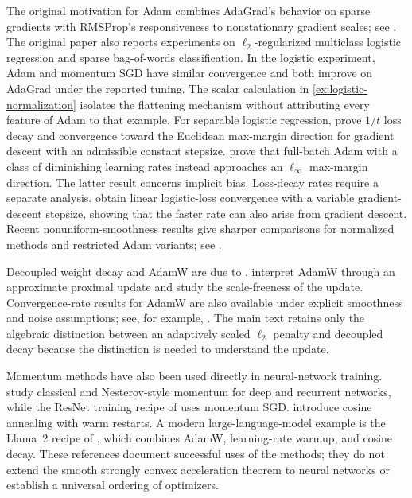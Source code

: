 \documentclass[11pt,twoside]{article}
\theoremstyle{definition}
\theoremstyle{remark}
\begin{document}
The original motivation for Adam combines AdaGrad's behavior on sparse
gradients with RMSProp's responsiveness to nonstationary gradient scales; see
\citet{kingma2015}. The original paper also reports experiments on
$\ell_2$-regularized multiclass logistic regression and sparse bag-of-words
classification. In the logistic experiment, Adam and momentum SGD have
similar convergence and both improve on AdaGrad under the reported tuning.
The scalar calculation in
\cref{ex:logistic-normalization} isolates the flattening mechanism without
attributing every feature of Adam to that example. For separable logistic
regression, \citet{soudry2018} prove $1/t$ loss decay and convergence toward
the Euclidean max-margin direction for gradient descent with an admissible
constant stepsize.
\citet{zhang2024adambias} prove that full-batch Adam with a class of
diminishing learning rates instead approaches an $\ell_\infty$ max-margin
direction. The latter result concerns implicit bias. Loss-decay rates require
a separate analysis. \citet{axiotis2023} obtain linear logistic-loss
convergence with a variable gradient-descent stepsize, showing that the faster
rate can also arise from gradient descent. Recent nonuniform-smoothness results give sharper
comparisons for normalized methods and restricted Adam variants; see
\citet{vaswani2026}.

Decoupled weight decay and AdamW are due to \citet{loshchilov2019}.
\citet{zhuang2022} interpret AdamW through an approximate proximal update and
study the scale-freeness of the update. Convergence-rate results for AdamW are
also available under explicit smoothness and noise assumptions; see, for
example, \citet{li2025adamw}. The main text retains only the algebraic
distinction between an adaptively scaled $\ell_2$ penalty and decoupled decay
because the distinction is needed to understand the update.

Momentum methods have also been used directly in neural-network training.
\citet{sutskever2013} study classical and Nesterov-style momentum for deep and
recurrent networks, while the ResNet training recipe of \citet{he2016resnet}
uses momentum SGD. \citet{loshchilov2017sgdr} introduce cosine annealing with
warm restarts. A modern large-language-model example is the Llama~2 recipe of
\citet{touvron2023llama2}, which combines AdamW, learning-rate warmup, and
cosine decay. These references document successful uses of the methods; they
do not extend the smooth strongly convex acceleration theorem to neural
networks or establish a universal ordering of optimizers.
\end{document}
